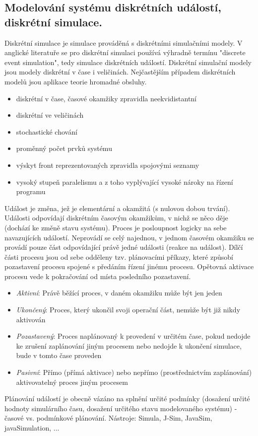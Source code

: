 \subsection{Modelování systému diskrétních událostí, diskrétní simulace.}
Diskrétní simulace je simulace prováděná s diskrétními simulačními modely. V anglické literatuře se pro diskrétní simulaci používá výhradně termínu "discrete event
simulation", tedy simulace diskrétních událostí. Diskrétní simulační modely jsou modely diskrétní v čase i veličinách. Nejčastějším případem diskrétních modelů jsou aplikace teorie hromadné obsluhy.
\begin{itemize}
\item diskrétní v čase, časové okamžiky zpravidla neekvidistantní
\item diskrétní ve veličinách
\item stochastické chování
\item proměnný počet prvků systému
\item výskyt front reprezentovaných zpravidla spojovými seznamy
\item vysoký stupeň paralelismu a z toho vyplývající vysoké nároky na řízení programu
\end{itemize}

Událost je změna, jež je elementární a okamžitá (s nulovou dobou trvání). Události odpovídají diskrétním časovým okamžikům, v nichž se něco děje (dochází ke změně
stavu systému). Proces je posloupnost logicky na sebe navazujících událostí. Neprovádí se celý najednou, v jednom časovém okamžiku se provádí pouze část odpovídající právě jedné události (reakce na událost). Dílčí části procesu jsou od sebe odděleny tzv. plánovacími příkazy, které způsobí pozastavení procesu spojené s předáním řízení jinému procesu. Opětovná aktivace procesu vede k pokračování od místa posledního pozastavení.
\begin{itemize}
\item \textit{Aktivní}: Právě běžící proces, v daném okamžiku může být jen jeden
\item \textit{Ukončený}: Proces, který ukončil svoji operační část, nemůže být již nikdy aktivován
\item \textit{Pozastavený}: Proces naplánovaný k provedení v určitém čase, pokud nedojde ke zrušení zaplánování jiným procesem nebo nedojde k ukončení simulace, bude v tomto čase proveden
\item \textit{Pasivní}: Přímo (přímá aktivace) nebo nepřímo (prostřednictvím zaplánování) aktivovatelný proces jiným procesem
\end{itemize}
Plánování událostí je obecně vázáno na splnění určité podmínky (dosažení určité hodnoty simulárního času, dosažení určitého stavu modelovaného systému) - časové vs. podmínkové plánování. Nástroje: Simula, J-Sim, JavaSim, javaSimulation, ...

